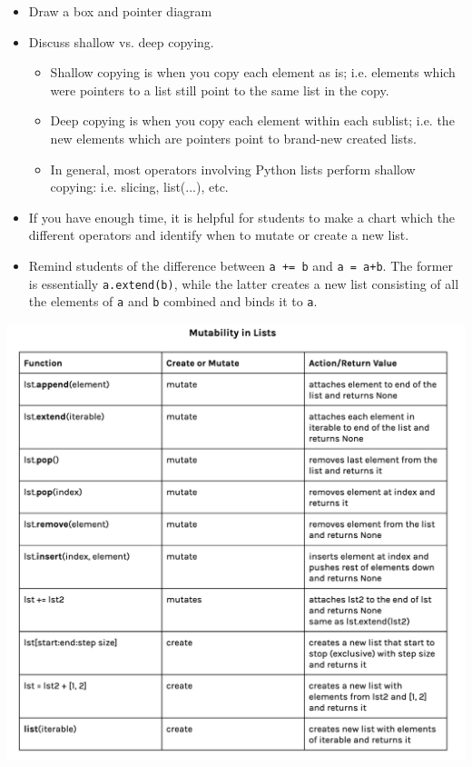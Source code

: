 \begin{blocksection}
	\begin{guide}
	\begin{itemize}
		\item Draw a box and pointer diagram
		\item Discuss shallow vs. deep copying. 
		\begin{itemize}
			\item Shallow copying is when you copy each element as is; i.e. elements which were pointers to a list still point to the same list in the copy.
			\item Deep copying is when you copy each element within each sublist; i.e. the new elements which are pointers point to brand-new created lists.
			\item In general, most operators involving Python lists perform shallow copying: i.e. slicing, list(...), etc.
		\end{itemize}
		\item If you have enough time, it is helpful for students to make a chart which the different operators and identify when to mutate or create a new list.
		\item Remind students of the difference between \lstinline{a += b} and \lstinline{a = a+b}. The former is essentially \lstinline{a.extend(b)}, while the latter creates a new list consisting of all the elements of \lstinline{a} and \lstinline{b} combined and binds it to \lstinline{a}.
	\end{itemize}
	\includegraphics[width=.9\textwidth]{list-mutation.png}
	\end{guide}
\end{blocksection}
	